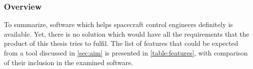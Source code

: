     \subsubsection{Overview}
        To summarize, software which helps spacecraft control engineers definitely is available. Yet, there is no solution which would have all the requirements that the product of this thesis tries to fulfil. The list of features that could be expected from a tool discussed in \autoref{sec:aim} is presented in \autoref{table:features}, with comparison of their inclusion in the examined software.

        \begin{table}[H]
\end{table}
